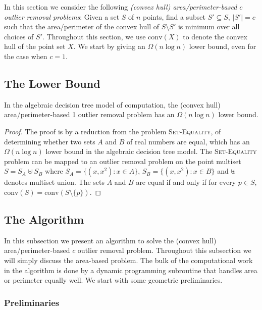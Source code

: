 \documentclass[lotsofwhite]{patmorin}
\newcommand{\ch}{\mathrm{conv}}
\begin{document}
In this section we consider the following \emph{(convex hull)
area/perimeter-based $c$ outlier removal problems}:  Given a set $S$
of $n$ points, find a subset $S'\subseteq S$, $|S'|=c$ such that the
area/perimeter of the convex hull of $S\setminus S'$ is minimum over
all choices of $S'$.  Throughout this section, we use $\ch(X)$ to
denote the convex hull of the point set $X$. We start by giving an
$\Omega(n\log n)$ lower bound, even for the case when $c=1$.


\subsection{The Lower Bound}


\begin{thm}
In the algebraic decision tree model of computation, the (convex hull)
area/perimeter-based 1 outlier removal problem has an 
$\Omega(n\log n)$ lower bound.
\end{thm}

\begin{proof}
The proof is by a reduction from the problem \textsc{Set-Equality}, of
determining whether two sets $A$ and $B$ of real numbers are equal,
which has an $\Omega(n\log n)$ lower bound in the algebraic decision
tree model.  The \textsc{Set-Equality} problem can be mapped to an
outlier removal problem on the point multiset $S=S_A \uplus S_B$ where
$S_A=\{(x,x^2): x\in A\}$, $S_B=\{(x,x^2):x\in B\}$ and $\uplus$
denotes multiset union. The sets $A$ and $B$ are equal if and only if
for every $p\in S$, $\ch(S)=\ch(S\setminus\{p\})$. 
\end{proof}

\subsection{The Algorithm}

In this subsection we present an algorithm to solve the (convex hull)
area/perimeter-based $c$ outlier removal problem.  Throughout this
subsection we will simply discuss the area-based problem.  The bulk of
the computational work in the algorithm is done by a dynamic
programming subroutine that handles area or perimeter equally well.
We start with some geometric preliminaries.

\subsubsection{Preliminaries} 
\end{document}
